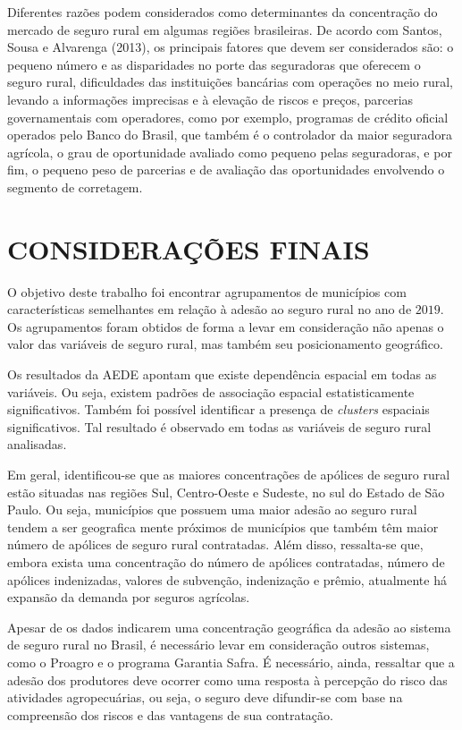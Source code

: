 \documentclass[
	12pt,				%
	openright,			%
	oneside,			%
	a4paper,			%
	chapter=TITLE,		%
	section=TITLE,		%
	english,			%
	french,				%
	spanish,			%
	brazil				%
	]{abntex2}
\begin{document}
Diferentes razões podem considerados como determinantes da concentração do mercado de seguro rural em algumas regiões brasileiras. De acordo com Santos, Sousa e Alvarenga (2013), os principais fatores que devem ser considerados são: o pequeno número e as disparidades no porte das seguradoras que oferecem o seguro rural, dificuldades das instituições bancárias com operações no meio rural, levando a informações imprecisas e à elevação de riscos e preços, parcerias governamentais com operadores, como por exemplo, programas de crédito oficial operados pelo Banco do Brasil, que também é o controlador da maior seguradora agrícola,  o grau de oportunidade avaliado como pequeno pelas seguradoras, e por fim, o pequeno peso de parcerias e de avaliação das oportunidades envolvendo o segmento de corretagem.   

\newpage
\section{\textbf{CONSIDERAÇÕES FINAIS}} \label{secconsfinais}


O objetivo deste trabalho foi encontrar agrupamentos de municípios com características semelhantes em relação à adesão ao seguro rural no ano de $2019$. Os agrupamentos foram obtidos de forma a levar em consideração não apenas o valor das variáveis de seguro rural, mas também seu posicionamento geográfico. 

Os resultados da AEDE apontam que existe dependência espacial em todas as variáveis. Ou seja, existem padrões de associação espacial estatisticamente significativos. Também foi possível identificar a presença de \textit{clusters} espaciais significativos. Tal resultado é observado em todas as variáveis de seguro rural analisadas. 

Em geral, identificou-se que as maiores concentrações de apólices de seguro rural estão situadas nas regiões Sul, Centro-Oeste e Sudeste, no sul do Estado de São Paulo. Ou seja, municípios que possuem uma maior adesão ao seguro rural tendem a ser geografica mente próximos de municípios que também têm maior número de apólices de seguro rural contratadas. Além disso, ressalta-se que, embora exista uma concentração do número de apólices contratadas, número de apólices indenizadas, valores de subvenção, indenização e prêmio, atualmente há expansão da demanda por seguros agrícolas. 

Apesar de os dados indicarem uma concentração geográfica da adesão ao sistema de seguro rural no Brasil, é necessário levar em consideração outros sistemas, como o Proagro e o programa Garantia Safra. É necessário, ainda, ressaltar que a adesão dos produtores deve ocorrer como uma resposta à percepção do risco das atividades agropecuárias, ou seja, o seguro deve difundir-se com base na compreensão dos riscos e das vantagens de sua contratação. 
\end{document}
